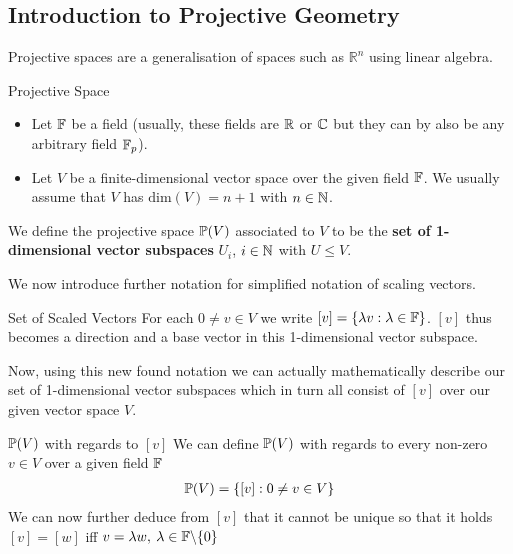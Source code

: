 \subsection{Introduction to Projective Geometry}

Projective spaces are a generalisation of spaces such as $\mathbb{R}^n$ using linear algebra. 

\begin{definitionBox}{Projective Space}    
    \begin{itemize}
        \item Let $\mathbb{F}$ be a field (usually, these fields are $\mathbb{R}$ or $\mathbb{C}$ but they can by also be any arbitrary field $\mathbb{F}_p$).
        \item Let $V$ be a finite-dimensional vector space over the given field $\mathbb{F}$. We usually assume that $V$ has $\mathrm{dim}(V) = n +1$ with $n \in \mathbb{N}$.
    \end{itemize}  

    We define the projective space $\mathbb{P}(V)$ associated to $V$ to be the \textbf{set of 1-dimensional vector subspaces} $U_i$, $i \in \mathbb{N}$ with $U \leq V$.
\end{definitionBox}



We now introduce further notation for simplified notation of scaling vectors.

\begin{definitionBox}{Set of Scaled Vectors}
    For each $0 \neq v \in V$ we write $[v] = \{\lambda v: \lambda \in \mathbb{F}\}$.
    $[v]$ thus becomes a direction and a base vector in this 1-dimensional vector subspace.
\end{definitionBox}



Now, using this new found notation we can actually mathematically describe our set of 1-dimensional vector subspaces which in turn all consist of $[v]$ over our given vector space $V$.

\begin{definitionBox}{$\mathbb{P}(V)$ with regards to $[v]$}
    We can define $\mathbb{P}(V)$ with regards to every non-zero $v \in V$ over a given field $\mathbb{F}$
    \begin{gather*}
        \mathbb{P}(V) = \{[v]: 0 \neq v \in V\}
    \end{gather*}
    We can now further deduce from $[v]$ that it cannot be unique so that it holds $[v] = [w]$ iff $v = \lambda w, \: \lambda \in \mathbb{F} \backslash \{0\}$
\end{definitionBox}


